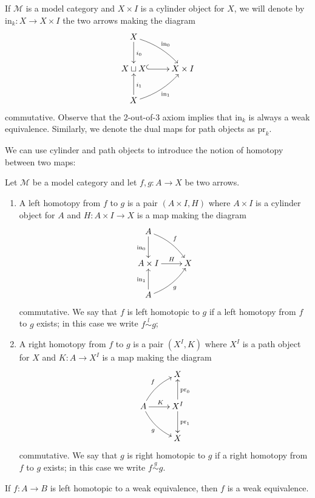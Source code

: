 \begin{refsection}
\begin{notation}
If $\mathcal M$ is a model category and $X \times I$ is a cylinder object for $X$, we will denote by $\mathrm{in}_k \colon X \to X \times I$ the two arrows making the diagram
\[
\xymatrix{ X \ar[d]^{i_0} \ar@/^.5pc/[dr]^{\mathrm{in}_0} \\ X \sqcup X \ar@{^(->}[r] & X \times I \\ X \ar[u]_{i_1} \ar@/_.5pc/[ur]_{\mathrm{in}_1} }
\]
commutative. Observe that the 2-out-of-3 axiom implies that $\mathrm{in}_k$ is always a weak equivalence. Similarly, we denote the dual maps for path objects as $\mathrm{pr}_k$.
\end{notation}

We can use cylinder and path objects to introduce the notion of homotopy between two maps:

\begin{defin}
Let $\mathcal M$ be a model category and let $f,g \colon A \to X$ be two arrows.
\begin{enumerate}
\item A left homotopy from $f$ to $g$ is a pair $(A \times I, H)$ where $A \times I$ is a cylinder object for $A$ and $H \colon A \times I \to X$ is a map making the diagram
\[
\xymatrix{
A \ar[d]_{\mathrm{in}_0} \ar@/^.5pc/[dr]^f \\ A \times I \ar[r]^-H & X \\ A \ar[u]^{\mathrm{in}_1} \ar@/_.5pc/[ur]_g
}
\]
commutative. We say that $f$ is left homotopic to $g$ if a left homotopy from $f$ to $g$ exists; in this case we write $f \stackrel{l}{\sim} g$;

\item A right homotopy from $f$ to $g$ is a pair $(X^I, K)$ where $X^I$ is a path object for $X$ and $K \colon A \to X^I$ is a map making the diagram
\[
\xymatrix{
& X \\
A \ar@/^.5pc/[ur]^f \ar[r]^K \ar@/_.5pc/[dr]_g & X^I \ar[u]_{\mathrm{pr}_0} \ar[d]^{\mathrm{pr}_1} \\ & X
}
\]
commutative. We say that $g$ is right homotopic to $g$ if a right homotopy from $f$ to $g$ exists; in this case we write $f \stackrel{g}{\sim} g$.
\end{enumerate}
\end{defin}

\begin{lemma} \label{lemma homotopy category 0}
If $f \colon A \to B$ is left homotopic to a weak equivalence, then $f$ is a weak equivalence.
\end{lemma}


\end{refsection}
